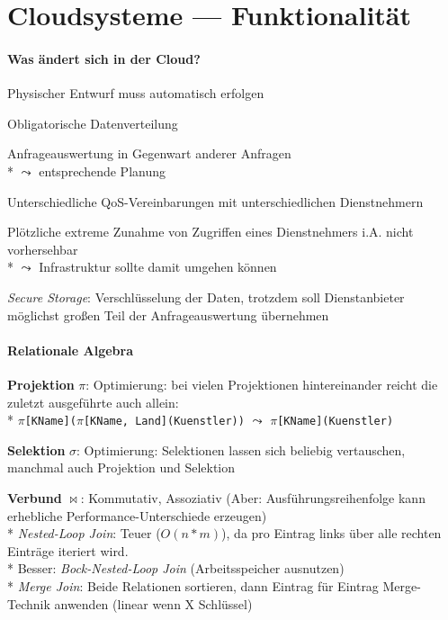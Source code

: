 \section{Cloudsysteme --- Funktionalität}
\label{sec:cloudfunktionalitaet}

\paragraph{Was ändert sich in der Cloud?}
\begin{items}
	\item Physischer Entwurf muss automatisch erfolgen
	\item Obligatorische Datenverteilung
	\item Anfrageauswertung in Gegenwart anderer Anfragen
		\\*
		\( \leadsto \) entsprechende Planung
	\item Unterschiedliche QoS-Vereinbarungen mit unterschiedlichen Dienstnehmern
	\item Plötzliche extreme Zunahme von Zugriffen eines Dienstnehmers i.A. nicht vorhersehbar 
		\\*
		\( \leadsto \) Infrastruktur sollte damit umgehen können
	\item \emph{Secure Storage}: Verschlüsselung der Daten, trotzdem soll Dienstanbieter möglichst großen Teil der Anfrageauswertung übernehmen
\end{items}

\paragraph{Relationale Algebra}
\begin{items}
	\item \textbf{Projektion} $\pi$: Optimierung: bei vielen Projektionen hintereinander reicht die zuletzt ausgeführte auch allein:
		\\*
		\( \pi \)\lstinline{[KName](}\( \pi \)\lstinline{[KName, Land](Kuenstler))} \( \leadsto \) \( \pi \)\lstinline{[KName](Kuenstler)}
	\item \textbf{Selektion} $\sigma$: Optimierung: Selektionen lassen sich beliebig vertauschen, manchmal auch Projektion und Selektion
	\item \textbf{Verbund} $\bowtie$: Kommutativ, Assoziativ (Aber: Ausführungsreihenfolge kann erhebliche Performance-Unterschiede erzeugen)
		\\*
		\emph{Nested-Loop Join}: Teuer ($O(n * m)$), da pro Eintrag links über alle rechten Einträge iteriert wird. \\*
		Besser: \emph{Bock-Nested-Loop Join }(Arbeitsspeicher ausnutzen)
		\\*
		\emph{Merge Join}: Beide Relationen sortieren, dann Eintrag für Eintrag Merge-Technik anwenden (linear wenn X Schlüssel)
\end{items}

